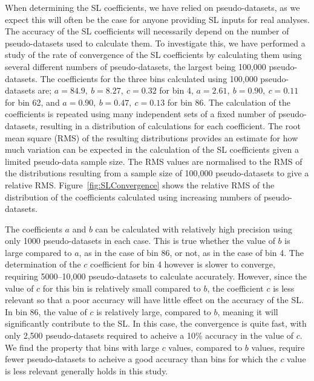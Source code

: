 \documentclass[11pt]{article}
\begin{document}
When determining the SL coefficients, we have relied on pseudo-datasets, as we expect this will often be the case for anyone providing SL 
inputs for real analyses. The accuracy of the SL coefficients will necessarily depend on the number of pseudo-datasets used to calculate them. 
To investigate this, we have performed a study of the rate of convergence of the SL coefficients by calculating them using several different 
numbers of pseudo-datasets, the largest being 100,000 pseudo-datasets.  
The coefficients for the three bins calculated using 100,000 pseudo-datasets are; $a=84.9,~b=8.27,~c=0.32$ for bin 4, 
$a=2.61,~b=0.90,~c=0.11$ for bin 62, and $a=0.90,~b=0.47,~c=0.13$ for bin 86. 
The calculation of the coefficients is repeated using many independent sets of a fixed number of pseudo-datasets, resulting in a distribution of 
calculations for each coefficient. 
The root mean square (RMS)  of the resulting distributions provides an estimate for how much variation can be expected in the calculation 
of the SL coefficients given a limited pseudo-data sample size. 
The RMS values are normalised to the RMS of the distributions resulting from a sample size of 
100,000 pseudo-datasets to give a relative RMS. 
Figure~\ref{fig:SLConvergence} shows the relative RMS of the distribution of the 
coefficients calculated using increasing numbers of pseudo-datasets. 

The coefficients $a$ and $b$ can be calculated with relatively high precision using only 1000 pseudo-datasets in each case. This is true 
whether the value of $b$ is large compared to $a$, as in the case of bin 86, or not, as in the case of bin 4. The determination of 
the $c$ coefficient for bin 4 
however is slower to converge, requiring 5000--10,000 pseudo-datasets to calculate accurately. However, since the value of $c$ for this bin is 
relatively small compared to $b$, the coefficient $c$ is less relevant so that a poor accuracy will have little effect on the accuracy of 
the SL. In bin 86, the value of $c$ is relatively large, compared to $b$, meaning it will significantly contribute to the SL. In this case, 
the convergence is quite fast, with only 2,500 pseudo-datasets required to acheive a 10\% accuracy in the value of $c$. We find the property 
that bins with large $c$ values, compared to $b$ values, require fewer pseudo-datasets to acheive a good accuracy than bins for which the $c$ value 
is less relevant generally holds in this study. 

\end{document}
